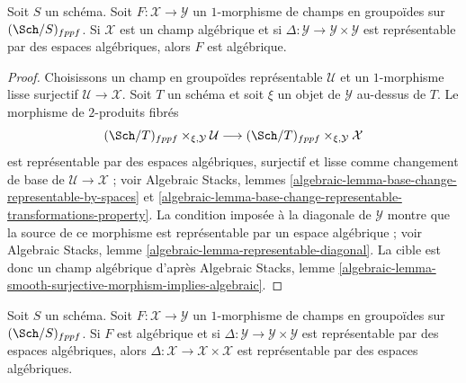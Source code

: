 \begin{lemma}
\label{lemma-map-from-algebraic}
Soit $S$ un schéma. Soit $F : \mathcal{X} \to \mathcal{Y}$ un $1$-morphisme
de champs en groupoïdes sur $(\Sch/S)_{fppf}$. Si $\mathcal{X}$ est un
champ algébrique et si $\Delta : \mathcal{Y} \to \mathcal{Y} \times \mathcal{Y}$
est représentable par des espaces algébriques, alors $F$ est algébrique.
\end{lemma}

\begin{proof}
Choisissons un champ en groupoïdes représentable $\mathcal{U}$ et un
$1$-morphisme lisse surjectif $\mathcal{U} \to \mathcal{X}$. Soit $T$ un schéma et
soit $\xi$ un objet de $\mathcal{Y}$ au-dessus de $T$. Le morphisme de
$2$-produits fibrés
$$
(\Sch/T)_{fppf} \times_{\xi, \mathcal{Y}} \mathcal{U}
\longrightarrow
(\Sch/T)_{fppf} \times_{\xi, \mathcal{Y}} \mathcal{X}
$$
est représentable par des espaces algébriques, surjectif et lisse comme
changement de base de $\mathcal{U} \to \mathcal{X}$ ; voir
Algebraic Stacks,
lemmes \ref{algebraic-lemma-base-change-representable-by-spaces} et
\ref{algebraic-lemma-base-change-representable-transformations-property}.
La condition imposée à la diagonale de $\mathcal{Y}$ montre que
la source de ce morphisme est représentable par un espace algébrique ; voir
Algebraic Stacks, lemme \ref{algebraic-lemma-representable-diagonal}.
La cible est donc un champ algébrique d'après
Algebraic Stacks,
lemme \ref{algebraic-lemma-smooth-surjective-morphism-implies-algebraic}.
\end{proof}

\begin{lemma}
\label{lemma-diagonals-and-algebraic-morphisms}
Soit $S$ un schéma. Soit $F : \mathcal{X} \to \mathcal{Y}$ un $1$-morphisme
de champs en groupoïdes sur $(\Sch/S)_{fppf}$.
Si $F$ est algébrique et si
$\Delta : \mathcal{Y} \to \mathcal{Y} \times \mathcal{Y}$
est représentable par des espaces algébriques, alors
$\Delta : \mathcal{X} \to \mathcal{X} \times \mathcal{X}$
est représentable par des espaces algébriques.
\end{lemma}

